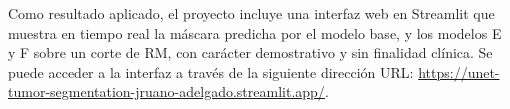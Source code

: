 Como resultado aplicado, el proyecto incluye una interfaz web en Streamlit que muestra en tiempo real la máscara predicha por el modelo base, y los modelos E y F sobre un corte de RM, con carácter demostrativo y sin finalidad clínica. Se puede acceder a la interfaz a través de la siguiente dirección URL: \url{https://unet-tumor-segmentation-jruano-adelgado.streamlit.app/}.